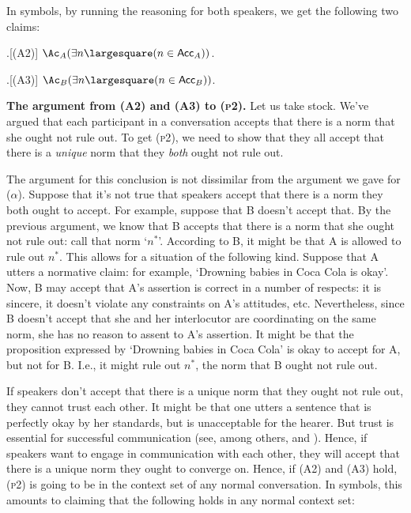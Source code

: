 \documentclass[11pt,article,oneside]{memoir}
\newcommand{\ought}{\largesquare}
\begin{document}
In symbols, by running the reasoning for both speakers, we get the following two claims:

\ex.[(A2)] $\Ac_A (\exists n \ought (n \in \mathsf{Acc}_A))$.

\ex.[(A3)] $\Ac_B (\exists n \ought (n \in \mathsf{Acc}_B))$.

\vspace{1\baselineskip}

\textbf{The argument from (A2) and (A3) to (\textsc{p2}).} Let us take stock. We've argued that each participant in a conversation accepts that there is a norm that she ought not rule out. To get (\textsc{p2}), we need to show that they all accept that there is a \textit{unique} norm that they \textit{both} ought not rule out. 

The argument for this conclusion is not dissimilar from the argument we gave for ($\alpha$). Suppose that it's not true that speakers accept that there is a norm they both ought to accept. For example, suppose that B doesn't accept that. By the previous argument, we know that B accepts that there is a norm that she ought not rule out: call that norm `$n^*$'. According to B, it might be that A is allowed to rule out $n^*$. This allows for a situation of the following kind. Suppose that A utters a normative claim: for example, `Drowning babies in Coca Cola is okay'. Now, B may accept that A's assertion is correct in a number of respects: it is sincere, it doesn't violate any constraints on A's attitudes, etc. Nevertheless, since B doesn't accept that she and her interlocutor are coordinating on the same norm, she has no reason to assent to A's assertion. It might be that the proposition expressed by `Drowning babies in Coca Cola' is okay to accept for A, but not for B. I.e., it might rule out $n^*$, the norm that B ought not rule out. 

If speakers don't accept that there is a unique norm that they ought not rule out, they cannot trust each other. It might be that one utters a sentence that is perfectly okay by her standards, but is unacceptable for the hearer. But trust is essential for successful communication (see, among others, \citet{lewis[convention]} and \citet{lewis[lang&lang]}). Hence, if speakers want to engage in communication with each other, they will accept that there is a unique norm they ought to converge on. Hence, if (A2) and (A3) hold, (\textsc{p2}) is going to be in the context set of any normal conversation. In symbols, this amounts to claiming that the following holds in any normal context set:
\end{document}
